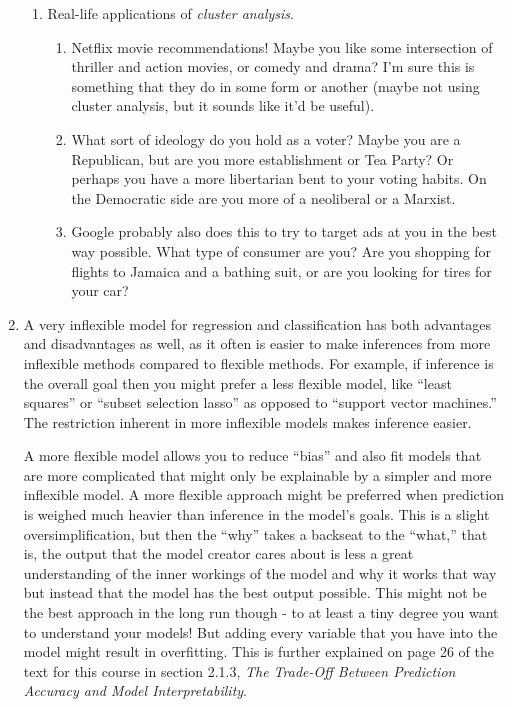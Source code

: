 \documentclass[11pt]{article}
\begin{document}
\begin{enumerate}
\begin{enumerate}
      \item Real-life applications of \emph{cluster analysis}.
       \begin{enumerate}
            \item Netflix movie recommendations! Maybe you like some intersection of thriller and action movies, or comedy and drama? I'm sure this is something that they do in some form or another (maybe not using cluster analysis, but it sounds like it'd be useful).
            \item What sort of ideology do you hold as a voter? Maybe you are a Republican, but are you more establishment or Tea Party? Or perhaps you have a more libertarian bent to your voting habits. On the Democratic side are you more of a neoliberal or a Marxist.
            \item Google probably also does this to try to target ads at you in the best way possible. What type of consumer are you? Are you shopping for flights to Jamaica and a bathing suit, or are you looking for tires for your car?
        \end{enumerate}
        
    \end{enumerate}
  
  \item A very inflexible model for regression and classification has both advantages and disadvantages as well, as it often is easier to make inferences from more inflexible methods compared to flexible methods. For example, if inference is the overall goal then you might prefer a less flexible model, like ``least squares'' or ``subset selection lasso'' as opposed to ``support vector machines.'' The restriction inherent in more inflexible models makes inference easier.
 
        A more flexible model allows you to reduce ``bias'' and also fit models that are more complicated that might only be explainable by a simpler and more inflexible model. A more flexible approach might be preferred when prediction is weighed much heavier than inference in the model's goals. This is a slight oversimplification, but then the ``why'' takes a backseat to the ``what,'' that is, the output that the model creator cares about is less a great understanding of the inner workings of the model and why it works that way but instead that the model has the best output possible. This might not be the best approach in the long run though - to at least a tiny degree you want to understand your models! But adding every variable that you have into the model might result in overfitting. This is further explained on page 26 of the text for this course in section 2.1.3, \emph{The Trade-Off Between Prediction Accuracy and Model Interpretability}.
  

\end{enumerate}
\end{document}
